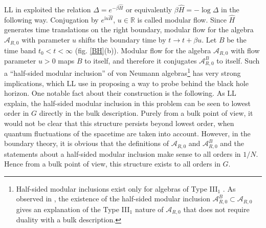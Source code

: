 \documentclass[11pt,a4paper]{article}
\def\i{{\mathrm i}}
\def\h{\widehat}
\def\A{{\mathcal A}}
\def\R{{\mathbb R}}
\def\h{\widehat}
\begin{document}
LL in \cite{LL,LL2} exploited the relation $\Delta=e^{-\beta\h H}$ or equivalently $\beta \h H=-\log \Delta$ in the following way.  
Conjugation by $e^{\i u\h H}$, $u\in \R$ is called modular flow.   Since $\h H$ generates time translations on the right boundary, 
modular flow for the algebra $\A_{R,0}$ with parameter $u$ shifts the boundary time by $t\to t+\beta u$.     Let $B$ be the time band $t_0<t <\infty$ (fig. \ref{BH}(b)).   Modular flow for
the algebra $\A_{R,0}$ with flow parameter $u>0$ maps $B$ to itself, and therefore it conjugates $\A_{R,0}^B $ to itself.   Such a ``half-sided modular inclusion'' of von Neumann algebras\footnote{\label{noted}Half-sided modular inclusions exist only for algebras of Type III$_1$ \cite{Borch}.   As observed in \cite{LL,LL2}, the existence of the half-sided modular inclusion $\A_{R,0}^B\subset \A_{R,0}$  gives an explanation of the Type III$_1$ nature
of $\A_{R,0}$  that does not require duality with a bulk description.}   has very strong
implications, which LL use in proposing a way to probe behind the black hole horizon.     One notable fact about their construction is the following.    As LL explain,
the half-sided modular inclusion in this problem can be seen to lowest order in $G$ directly in the bulk description.   Purely from a bulk point of view,
it would not be clear that this structure persists beyond lowest order, when quantum fluctuations of the spacetime are taken into account.    However,
in the boundary theory, it is obvious that the definitions of $\A_{R,0}$ and $\A_{R,0}^B$ and the statements about a half-sided modular inclusion make sense
to all orders in $1/N$.  Hence from a bulk point of view, this structure exists to all orders in $G$.   
\end{document}
